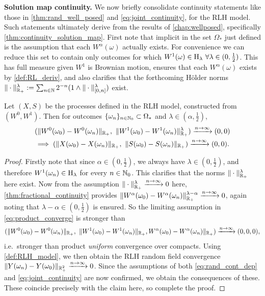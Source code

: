 \vspace{3mm}\textbf{Solution map continuity.} We now briefly consolidate continuity statements like those in \autoref{thm:rand_well_posed} and \autoref{eq:joint_continuity}, for the RLH model. Such statements ultimately derive from the results of \autoref{chap:wellposed}, specifically \autoref{thm:continuity_solution_map}. First note that implicit in the set $\Omega_*$ just defined is the assumption that each $W^\alpha(\omega)$ actually exists. For convenience we can reduce this set to contain only outcomes for which $W^1(\omega)\in \mathrm{H}_\lambda\ \forall\lambda\in(0,\tfrac12)$. This has full measure given $W^1$ is Brownian motion, ensures that each $W^\alpha(\omega)$ exists by \autoref{def:RL_deriv}, and also clarifies that the forthcoming H\"older norms $\Vert\cdot\Vert^\lambda_{\mathbb{R}_+}:=\sum_{n\in\mathbb{N}} 2^{-n}(1\wedge \Vert\cdot\Vert^\lambda_{[0,n]})$ exist.

\begin{theorem}\label{cor:RLH_continuity}
    Let $(X,S)$ be the processes defined in the RLH model, constructed from $(W^0,W^1)$.
    Then for outcomes $\{\omega_n\}_{n\in\mathbb{N}_0}\subset\Omega_*$ and $\lambda\in(\alpha,\frac12)$,
    \begin{multline}\label{eq:product_converge}
        (\Vert W^0(\omega_0) - W^0(\omega_n)\Vert_{\mathbb{R}_+},\
        \Vert W^1(\omega_0) - W^1(\omega_n)\Vert_{\mathbb{R}_+}^\lambda)
        \xrightarrow{n\to\infty}(0,0)\\
        \implies
        (\Vert X(\omega_0) - X(\omega_n) \Vert_{\mathbb{R}_+},\ \Vert S(\omega_0) - S(\omega_n) \Vert_{\mathbb{R}_+})
        \xrightarrow{n\to\infty}(0,0).
    \end{multline}
\end{theorem}
\begin{proof}
    Firstly note that since $\alpha\in(0,\frac12)$, we always have  $\lambda\in(0,\frac12)$, and therefore $W^1(\omega_n)\in\mathrm{H}_\lambda$ for every $n\in\mathbb{N}_0$. This clarifies that the norms $\Vert\cdot\Vert^\lambda_{\mathbb{R}_+}$ here exist. Now from the assumption $\Vert\cdot\Vert^\lambda_{\mathbb{R}_+}\xrightarrow{n\to\infty}0$ here, \autoref{thm:fractional_continuity} provides $\Vert W^\alpha(\omega_0) - W^\alpha(\omega_n)\Vert^{\lambda-\alpha}_{\mathbb{R}_+}\xrightarrow{n\to\infty}0$, again noting that $\lambda-\alpha\in(0,\frac12)$ is ensured. So the limiting assumption in \autoref{eq:product_converge} is stronger than~
    \begin{equation}\label{eq:assumption_rlh_cont}
        (\Vert W^0(\omega_0) - W^0(\omega_n)\Vert_{\mathbb{R}_+},\
        \Vert W^1(\omega_0) - W^1(\omega_n)\Vert_{\mathbb{R}_+}, W^\alpha(\omega_0) - W^\alpha(\omega_n)\Vert_{\mathbb{R}_+})
        \xrightarrow{n\to\infty}(0,0,0),
    \end{equation}
    i.e.~stronger than product \emph{uniform} convergence over compacts. Using \autoref{def:RLH_model}, we then obtain the RLH random field convergence $\Vert Y(\omega_n)-Y(\omega_0)\Vert_{\mathbb{R}_+^2}\xrightarrow{n\to\infty}0$. Since the assumptions of both \autoref{eq:rand_cont_dep} and \autoref{eq:joint_continuity} are now confirmed, we obtain the consequences of these. These coincide precisely with the claim here, so complete the proof.
\end{proof}


